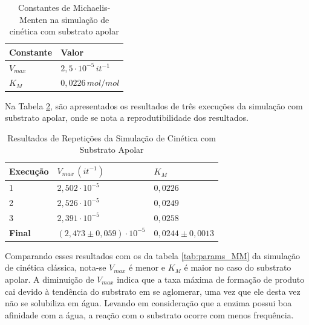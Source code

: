 \documentclass[12pt,oneside]{report}
\begin{document}
\begin{table}[H]
    \centering
    \caption{Constantes de Michaelis-Menten na simulação de cinética com substrato apolar}
    \vspace{0.2cm}
    \begin{tabularx}{\textwidth}{X m{5cm}}
        \hline
        \textbf{Constante} & \textbf{Valor}                   \\
        \hline
        $V_{max}$          & $2{,}5 \cdot 10^{-5} \, it^{-1}$ \\
        $K_M$              & $0{,}0226 \, mol/mol$            \\
        \hline
    \end{tabularx}
    \vspace{0.2cm}
    \label{tab:params_MM_apolar}
\end{table}

Na Tabela \ref{tab:params_MM_apolar_repeticoes}, são apresentados os resultados de três execuções da simulação com substrato apolar, onde se nota a reprodutibilidade dos resultados.

\begin{table}[H]
    \centering
    \caption{Resultados de Repetições da Simulação de Cinética com Substrato Apolar}
    \vspace{0.2cm}
    \begin{tabularx}{\textwidth}{X X m{5cm}}
        \hline
        \textbf{Execução} & \textbf{$V_{max} \, (it^{-1})$ }      & \textbf{$K_M$}          \\
        \hline
        1                 & $2{,}502 \cdot 10^{-5}$               & $0{,}0226$              \\
        2                 & $2{,}526 \cdot 10^{-5}$               & $0{,}0249$              \\
        3                 & $2{,}391 \cdot 10^{-5}$               & $0{,}0258$              \\
        \hline
        \textbf{Final}    & $(2{,}473 \pm 0{,}059) \cdot 10^{-5}$ & $0{,}0244 \pm 0{,}0013$ \\
        \hline
    \end{tabularx}
    \vspace{0.2cm}
    \label{tab:params_MM_apolar_repeticoes}
\end{table}

Comparando esses resultados com os da tabela \ref{tab:params_MM} da simulação de cinética clássica, nota-se $V_{max}$ é menor e $K_M$ é maior no caso do substrato apolar. A diminuição de $V_{max}$ indica que a taxa máxima de formação de produto cai devido à tendência do substrato em se aglomerar, uma vez que ele desta vez não se solubiliza em água. Levando em consideração que a enzima possui boa afinidade com a água, a reação com o substrato ocorre com menos frequência.
\end{document}
